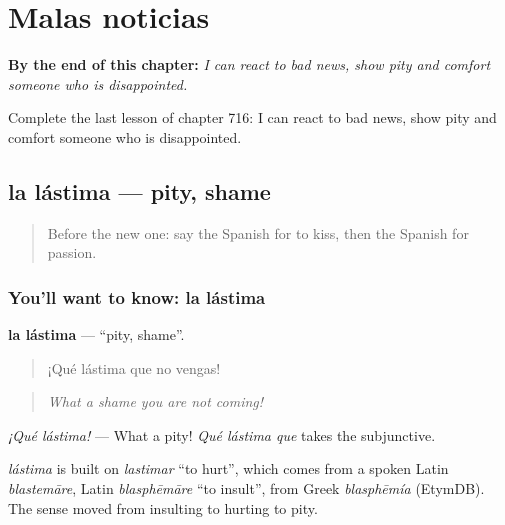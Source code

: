 
\chapter{Malas noticias}
\label{ch:es-malas-noticias}

\begin{chapteropening}
\textbf{By the end of this chapter:} \emph{I can react to bad news, show pity and comfort someone who is disappointed.}

Complete the last lesson of chapter 716: I can react to bad news, show pity and comfort someone who is disappointed.
\end{chapteropening}

\section[la lástima]{la lástima — pity, shame}

\label{lesson:ES-C716-lastima}



\begin{quote}
Before the new one: say the Spanish for to kiss, then the Spanish for passion.
\end{quote}

\subsection*{You'll want to know: la lástima}
\textbf{la lástima} — \textquotedblleft{}pity, shame\textquotedblright{}.

\begin{quote}
¡Qué lástima que no vengas!
\end{quote}

\begin{quote}
\emph{What a shame you are not coming!}
\end{quote}

\emph{¡Qué lástima!} — What a pity! \emph{Qué lástima que} takes the subjunctive.

\begin{cousinweb}
\emph{lástima} is built on \emph{lastimar} \textquotedblleft{}to hurt\textquotedblright{}, which comes from a spoken Latin \emph{blastemāre}, Latin \emph{blasphēmāre} \textquotedblleft{}to insult\textquotedblright{}, from Greek \emph{blasphēmía} (EtymDB). The sense moved from insulting to hurting to pity.
\end{cousinweb}


